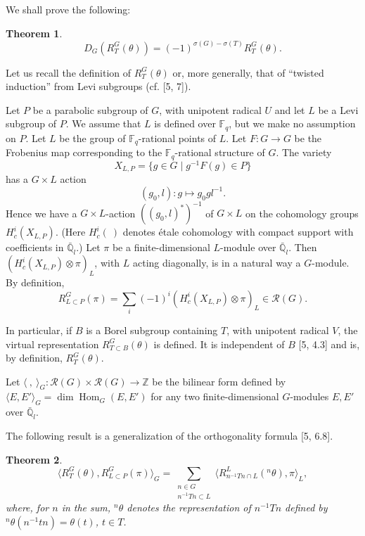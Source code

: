 \documentclass[12pt,a4paper]{article}
\theoremstyle{plain}
\newtheorem{theorem}{Theorem}[section]
\theoremstyle{remark}
\DeclareMathOperator{\Hom}{Hom}
\newcommand{\sR}{\mathcal{R}}
\begin{document}
We shall prove the following:

\begin{theorem}
\begin{equation*}
D_G(R_T^G(\theta)) = (-1)^{\sigma(G)-\sigma(T)} R_T^G(\theta).
\end{equation*}
\end{theorem}

Let us recall the definition of $R_T^G(\theta)$ or, more generally, that of ``twisted induction'' from Levi subgroups (cf. [5, 7]).

Let $P$ be a parabolic subgroup of $G$, with unipotent radical $U$ and let $L$ be a Levi subgroup of $P$. We assume that $L$ is defined over $\mathbb{F}_q$, but we make no assumption on $P$. Let $L$ be the group of $\mathbb{F}_q$-rational points of $L$. Let $F \colon G \to G$ be the Frobenius map corresponding to the $\mathbb{F}_q$-rational structure of $G$. The variety
\begin{equation*}
X_{L,P} = \{g \in G \mid g^{-1}F(g) \in P\}
\end{equation*}
has a $G \times L$ action
\begin{equation*}
(g_0,l) \colon g \mapsto g_0 g l^{-1}.
\end{equation*}
Hence we have a $G \times L$-action $((g_0,l)^*)^{-1}$ of $G \times L$ on the cohomology groups $H_c^i(X_{L,P})$. (Here $H_c^i(\ )$ denotes \'etale cohomology with compact support with coefficients in $\bar{\mathbb{Q}}_l$.) Let $\pi$ be a finite-dimensional $L$-module over $\bar{\mathbb{Q}}_l$. Then $(H_c^i(X_{L,P}) \otimes \pi)_L$, with $L$ acting diagonally, is in a natural way a $G$-module. By definition,
\begin{equation*}
R_{L\subset P}^G(\pi) = \sum_i (-1)^i (H_c^i(X_{L,P}) \otimes \pi)_L \in \sR(G).
\end{equation*}

In particular, if $B$ is a Borel subgroup containing $T$, with unipotent radical $V$, the virtual representation $R_{T\subset B}^G(\theta)$ is defined. It is independent of $B$ [5, 4.3] and is, by definition, $R_T^G(\theta)$.

Let $\langle\ ,\ \rangle_G \colon \sR(G) \times \sR(G) \to \mathbb{Z}$ be the bilinear form defined by $\langle E, E' \rangle_G = \dim \Hom_G(E,E')$ for any two finite-dimensional $G$-modules $E, E'$ over $\bar{\mathbb{Q}}_l$.

The following result is a generalization of the orthogonality formula [5, 6.8].

\begin{theorem}
\begin{equation*}
\langle R_T^G(\theta), R_{L\subset P}^G(\pi) \rangle_G = \sum_{\substack{n \in G \\ n^{-1}Tn \subset L}} \langle R_{n^{-1}Tn \cap L}^{L}({}^n\theta), \pi \rangle_L,
\end{equation*}
where, for $n$ in the sum, ${}^n\theta$ denotes the representation of $n^{-1}Tn$ defined by ${}^n\theta(n^{-1}tn) = \theta(t)$, $t \in T$.
\end{theorem}
\end{document}
